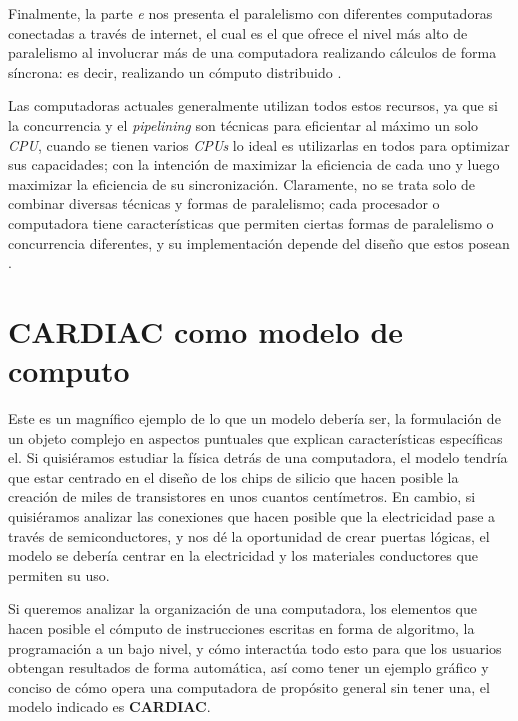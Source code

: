 \documentclass[letterpaper,12pt,oneside]{book}
\begin{document}
        Finalmente, la parte \textit{e} nos presenta el paralelismo
		con diferentes computadoras conectadas a través de internet, el cual es el que ofrece el nivel más alto de paralelismo al involucrar
		más de una computadora realizando cálculos de forma síncrona: es decir, realizando un cómputo distribuido \cite{tanenbaum_structured_2013}.

		
		
		Las computadoras actuales generalmente utilizan todos estos recursos, ya que si la concurrencia y el \textit{pipelining} son técnicas
		para eficientar al máximo un solo \textit{CPU}, cuando se tienen varios \textit{CPUs} lo ideal es utilizarlas en todos para optimizar sus capacidades; con la intención de maximizar la eficiencia de cada uno y luego maximizar la eficiencia
		de su sincronización. Claramente, no se trata solo de combinar diversas técnicas y formas de paralelismo; cada procesador o computadora
		tiene características que permiten ciertas formas de paralelismo o concurrencia diferentes, y su implementación depende del diseño que estos posean \cite{tanenbaum_structured_2013}.

	\clearpage			
	
	\section{CARDIAC como modelo de computo}
	
	Este es un magnífico ejemplo de lo que un modelo debería ser, la formulación de un objeto
	complejo en aspectos puntuales que explican características específicas el.
 Si quisiéramos estudiar la física detrás de una computadora, el modelo tendría que estar centrado
	en el diseño de los chips de silicio que hacen posible la creación de miles de transistores en unos cuantos centímetros. En cambio, si quisiéramos 
	analizar las conexiones que hacen posible que la electricidad pase a través de semiconductores, y nos dé la oportunidad de crear puertas lógicas,
	el modelo se debería centrar en la electricidad y los materiales conductores que permiten su uso.
 
    Si queremos analizar la organización
	de una computadora, los elementos que hacen posible el cómputo de instrucciones escritas en 
	forma de algoritmo, la programación
	a un bajo nivel, y cómo interactúa todo esto para que los usuarios obtengan resultados 
	de forma automática, así como tener un ejemplo gráfico y 	
	conciso de cómo opera una computadora
	de propósito general sin tener una, el modelo indicado es \textbf{CARDIAC}.
	
\end{document}
